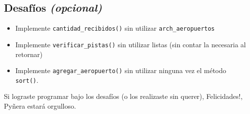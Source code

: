 \begin{itemize}
\begin{center}
\end{center}
\end{itemize}
\subsection{Desafíos \textit{(opcional)}}
\begin{itemize}
    \item Implemente \texttt{cantidad\_recibidos()} sin utilizar \texttt{arch\_aeropuertos}
    \item Implemente \texttt{verificar\_pistas()} sin utilizar listas (sin contar la necesaria al retornar)
    \item Implemente \texttt{agregar\_aeropuerto()} sin utilizar ninguna vez el método \texttt{sort()}.
\end{itemize}
Si lograste programar bajo los desafíos (o los realizaste sin querer), Felicidades!, Pyñera estará orgulloso.


